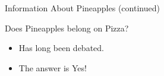 \documentclass{beamer}
\begin{document}
\begin{frame}{Information About Pineapples (continued)}

\begin{alertblock}{Does Pineapples belong on Pizza?}
\begin{itemize}
    \item Has long been debated. \pause
    \item The answer is \alert{Yes!}
\end{itemize}
\end{alertblock}

\end{frame}
\end{document}
